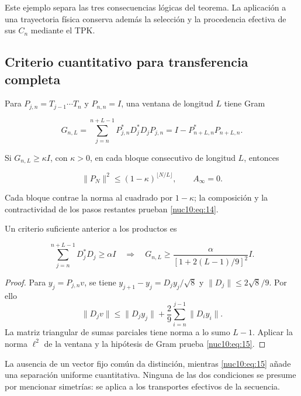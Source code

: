 Este ejemplo separa las tres consecuencias lógicas del teorema. La
aplicación a una trayectoria física conserva además la selección y la
procedencia efectiva de sus \(C_n\) mediante el TPK.

\subsection{Criterio cuantitativo para transferencia completa}

Para \(P_{j,n}=T_{j-1}\cdots T_n\) y \(P_{n,n}=I\), una ventana de longitud \(L\) tiene Gram



\[
G_{n,L}=\sum_{j=n}^{n+L-1}P_{j,n}^*D_j^*D_jP_{j,n}
=I-P_{n+L,n}^*P_{n+L,n}.
\]



Si \(G_{n,L}\geq\kappa I\), con \(\kappa>0\), en cada bloque consecutivo de longitud \(L\), entonces



\begin{equation}
\|P_N\|^2\le(1-\kappa)^{\lfloor N/L\rfloor},\qquad A_\infty=0.
\label{nuc10:eq:14}
\end{equation}



Cada bloque contrae la norma al cuadrado por \(1-\kappa\); la composición y la contractividad de los pasos restantes prueban \eqref{nuc10:eq:14}.

Un criterio suficiente anterior a los productos es



\begin{equation}
\sum_{j=n}^{n+L-1}D_j^*D_j\ge\alpha I
\quad\Longrightarrow\quad
G_{n,L}\ge\frac{\alpha}{[1+2(L-1)/9]^2}I.
\label{nuc10:eq:15}
\end{equation}



\begin{proof}
Para \(y_j=P_{j,n}v\), se tiene
\(y_{j+1}-y_j=D_jy_j/\sqrt8\) y \(\|D_j\|\leq2\sqrt8/9\). Por ello
\[
\|D_jv\|\leq\|D_jy_j\|+\frac29\sum_{i=n}^{j-1}\|D_iy_i\|.
\]
La matriz triangular de sumas parciales tiene norma a lo sumo \(L-1\).
Aplicar la norma \(\ell^2\) de la ventana y la hipótesis de Gram prueba \eqref{nuc10:eq:15}.

\end{proof}

La ausencia de un vector fijo común da distinción, mientras \eqref{nuc10:eq:15} añade una separación uniforme cuantitativa. Ninguna de las dos condiciones se presume por mencionar simetrías: se aplica a los transportes efectivos de la secuencia.

